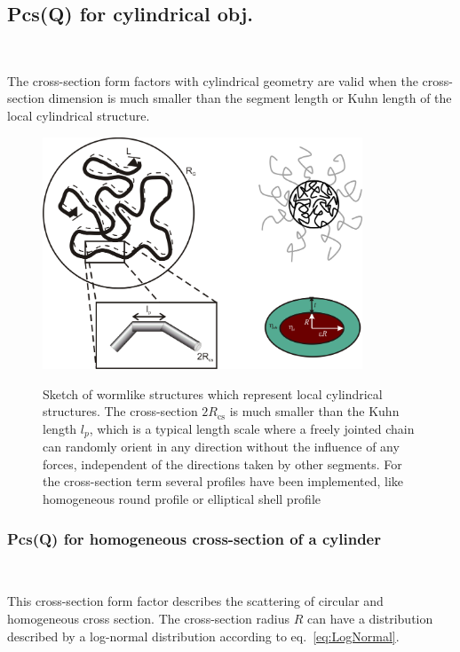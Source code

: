 \clearpage
\subsection{Pcs(Q) for cylindrical obj.} ~\\
\label{plugin:Pcs4cylindrical}

The cross-section form factors with cylindrical geometry are valid
when the cross-section dimension is much smaller than the segment length
or Kuhn length of the local cylindrical structure.

\begin{figure}[htb]
  \includegraphics[width=0.85\textwidth]{../images/form_factor/anisotropic/SketchdiffXSWorm.png}\\
  \caption{Sketch of wormlike structures which represent local cylindrical structures. The cross-section $2R_\text{cs}$
  is much smaller than the Kuhn length $l_p$, which is a typical length scale where a freely jointed chain can randomly orient
  in any direction without the influence of any forces, independent of the directions taken by other segments.
  For the cross-section term several profiles have been implemented, like homogeneous round profile or elliptical shell profile}\label{fig:WormSketchdiffXS}
\end{figure}


\clearpage
\subsubsection{Pcs(Q) for homogeneous cross-section of a cylinder} ~\\
\label{plugin:Pcs:homogeneousXS_cyl}


This cross-section form factor describes the scattering of circular and homogeneous cross section.
The cross-section radius $R$ can have a distribution described by a log-normal distribution according
to eq.\ \ref{eq:LogNormal}.

